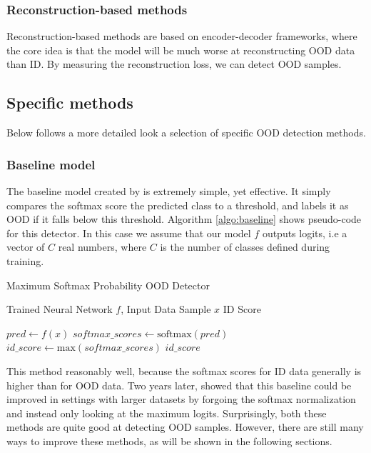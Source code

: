 \documentclass[UKenglish]{uiomasterthesis} %
\theoremstyle{definition}
\begin{document}
\subsubsection{Reconstruction-based methods}

Reconstruction-based methods are based on encoder-decoder frameworks, where the core idea is that the model will be much worse at reconstructing OOD data than ID. By measuring the reconstruction loss, we can detect OOD samples.
\\

\subsection{Specific methods} \label{ood_specific}

Below follows a more detailed look a selection of specific OOD detection methods.

\subsubsection{Baseline model} \label{ood_baseline}

The baseline model created by \cite{oodbaseline} is extremely simple, yet effective. It simply compares the softmax score the predicted class to a threshold, and labels it as OOD if it falls below this threshold. Algorithm \ref{algo:baseline} shows pseudo-code for this detector. In this case we assume that our model $f$ outputs logits, i.e a vector of $C$ real numbers, where $C$ is the number of classes defined during training.

\begin{algorithm}
    \caption{Maximum Softmax Probability OOD Detector}
    \label{algo:baseline}
    \begin{algorithmic}
    \Require Trained Neural Network $f$, Input Data Sample $x$
    \Ensure ID Score

        \State $pred \gets f(x)$
        \State $softmax\_scores \gets \text{softmax}(pred)$
        \State $id\_score \gets \text{max}(softmax\_scores)$
        \State \Return $id\_score$
    \EndFunction

    \end{algorithmic}
\end{algorithm}

This method reasonably well, because the softmax scores for ID data generally is higher than for OOD data. Two years later, \cite{mls} showed that this baseline could be improved in settings with larger datasets by forgoing the softmax normalization and instead only looking at the maximum logits. Surprisingly, both these methods are quite good at detecting OOD samples. However, there are still many ways to improve these methods, as will be shown in the following sections.
\\
\end{document}
